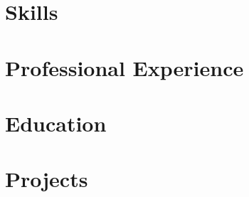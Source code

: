 \documentclass[10pt]{article}
\begin{document}
\pagestyle{others}\thispagestyle{first_page}



\section{Skills}


\section{Professional Experience}



\section{Education}


\section{Projects}

\end{document}
